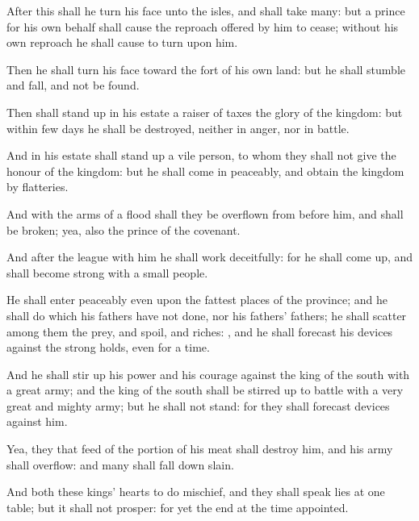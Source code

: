 {After this shall he
turn his
face unto the
isles, and shall
take
many: but a
prince for his own behalf shall cause the
reproach offered by him to
cease;
without his own
reproach he shall cause
{} to
turn upon him.

Then he shall
turn his
face toward the
fort of his own
land: but he shall
stumble and
fall, and not be
found.

Then shall stand
up in his
estate a
raiser of
taxes
{} the
glory of the
kingdom: but within
few
days he shall be
destroyed, neither in
anger, nor in
battle.


\par }{\PP {}And in his
estate shall stand
up a vile
person, to whom they shall not
give the
honour of the
kingdom: but he shall
come in
peaceably, and
obtain the
kingdom by
flatteries.

And with the
arms of a
flood shall they be
overflown from
before him, and shall be
broken; yea, also the
prince of the
covenant.

And after the
league
{} with him he shall
work
deceitfully: for he shall come
up, and shall become
strong with a
small
people.

He shall
enter
peaceably even upon the fattest
places of the
province; and he shall
do
{} which his
fathers have not
done, nor his
fathers’
fathers; he shall
scatter among them the
prey, and
spoil, and
riches:
{}, and he shall
forecast his
devices against the strong
holds, even for a
time.

And he shall stir
up his
power and his
courage against the
king of the
south with a
great
army; and the
king of the
south shall be stirred
up to
battle with a
very
great and
mighty
army; but he shall not
stand: for they shall
forecast
devices against him.

Yea, they that
feed of the portion of his
meat shall
destroy him, and his
army shall
overflow: and
many shall
fall down
slain.

And
both these
kings’
hearts
{} to do
mischief, and they shall
speak
lies at
one
table; but it shall not
prosper: for yet the
end
{} at the time
appointed.

}
